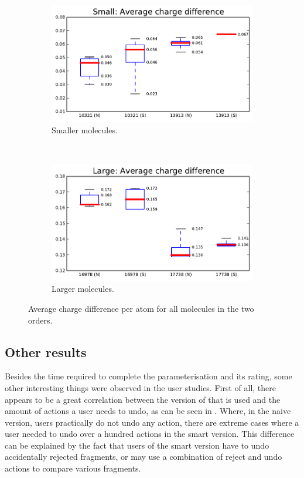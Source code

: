 \begin{figure}[h!]
\centering
\begin{subfigure}[t]{0.48\textwidth}
\centering
\includegraphics[width=\textwidth]{img/graphs/1c_01.pdf}
\caption{Smaller molecules.}
\end{subfigure}%
~
\begin{subfigure}[t]{0.48\textwidth}
\centering
\includegraphics[width=\textwidth]{img/graphs/1d_01.pdf}
\caption{Larger molecules.}
\end{subfigure}
\caption{Average charge difference per atom for all molecules in the two orders.}
\end{figure}

\subsection{Other results}
Besides the time required to complete the parameterisation and its rating, some other interesting things were observed in the user studies. First of all, there appears to be a great correlation between the version of \oframp{} that is used and the amount of actions a user needs to undo, as can be seen in . Where, in the naive version, users practically do not undo any action, there are extreme cases where a user needed to undo over a hundred actions in the smart version. This difference can be explained by the fact that users of the smart version have to undo accidentally rejected fragments, or may use a combination of reject and undo actions to compare various fragments.

